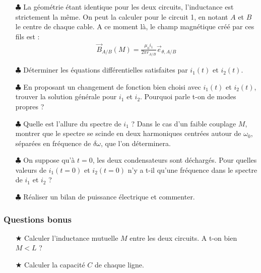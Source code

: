 \documentclass{report}
\begin{document}
\begin{itemize}

	\item[$\clubsuit$] La géométrie étant identique pour les deux circuits, l'inductance est strictement la même. On peut la calculer pour le circuit 1, en notant $A$ et $B$ le centre de chaque cable. A ce moment là, le champ magnétique créé par ces fils est :
	\begin{align*}
		\vec{B}_{A/B}(M) = \frac{\mu_0i_1}{2\pi r_{A/B}}\vec{e}_{\theta, A/B}
	\end{align*}

	\item[$\clubsuit$] Déterminer les équations différentielles satisfaites par $i_1(t)$ et $i_2(t)$.
	
	\item[$\clubsuit$] En proposant un changement de fonction bien choisi avec $i_1(t)$ et $i_2(t)$, trouver la solution générale pour $i_1$ et $i_2$. Pourquoi parle t-on de modes propres ?
	
	\item[$\clubsuit$] Quelle est l'allure du spectre de $i_1$ ? Dans le cas d'un faible couplage $M$, montrer que le spectre se scinde en deux harmoniques centrées autour de $\omega_0$, séparées en fréquence de $\delta\omega$, que l'on déterminera.  
	
	\item[$\clubsuit$] On suppose qu'à $t=0$, les deux condensateurs sont déchargés. Pour quelles valeurs de $i_1(t=0)$ et $i_2(t=0)$ n'y a t-il qu'une fréquence dans le spectre de $i_1$ et $i_2$ ?
	
	\item[$\clubsuit$] Réaliser un bilan de puissance électrique et commenter. 	
	
\end{itemize}	

\subsubsection*{Questions bonus}

\begin{itemize}
		
	\item[$\bigstar$] Calculer l'inductance mutuelle $M$ entre les deux circuits. A t-on bien $M<L$ ? 
	
	\item[$\bigstar$] Calculer la capacité $C$ de chaque ligne. 
	
\end{itemize}
\end{document}
